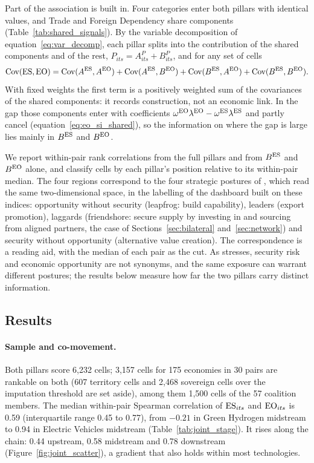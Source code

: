 Part of the association is built in. Four categories enter both pillars with identical values, and
Trade and Foreign Dependency share components (Table~\ref{tab:shared_signals}). By the variable
decomposition of equation~\eqref{eq:var_decomp}, each pillar splits into the contribution of the
shared components and of the rest, $P_{its}=A^{P}_{its}+B^{P}_{its}$, and for any set of cells
\begin{equation}\label{eq:joint_cov}
  \operatorname{Cov}(\mathrm{ES},\mathrm{EO})=\operatorname{Cov}(A^{\mathrm{ES}},A^{\mathrm{EO}})
  +\operatorname{Cov}(A^{\mathrm{ES}},B^{\mathrm{EO}})+\operatorname{Cov}(B^{\mathrm{ES}},A^{\mathrm{EO}})
  +\operatorname{Cov}(B^{\mathrm{ES}},B^{\mathrm{EO}}).
\end{equation}
With fixed weights the first term is a positively weighted sum of the covariances of the shared
components: it records construction, not an economic link. In the gap those components enter with
coefficients $\omega^{\mathrm{EO}}\lambda^{\mathrm{EO}}-\omega^{\mathrm{ES}}\lambda^{\mathrm{ES}}$ and partly cancel
(equation~\eqref{eq:eo_si_shared}), so the information on where the gap is large lies mainly in
$B^{\mathrm{ES}}$ and $B^{\mathrm{EO}}$.

We report within-pair rank correlations from the full pillars and from $B^{\mathrm{ES}}$ and $B^{\mathrm{EO}}$
alone, and classify cells by each pillar's position relative to its within-pair median. The four
regions correspond to the four strategic postures of \citet{carey2025secure}, which read the same
two-dimensional space, in the labelling of the dashboard built on these indices: opportunity without security
(leapfrog: build capability), leaders (export promotion), laggards (friendshore: secure supply
by investing in and sourcing from aligned partners, the case of Sections~\ref{sec:bilateral} and~\ref{sec:network}) and security
without opportunity (alternative value creation). The correspondence is a reading aid, with the
median of each pair as the cut. As \citet{neis2026allied} stresses, security risk and economic
opportunity are not synonyms, and the same exposure can warrant different postures; the results
below measure how far the two pillars carry distinct information.

\subsection{Results}\label{subsec:joint_results}

\paragraph{Sample and co-movement.} Both pillars score 6{,}232 cells; 3{,}157 cells for 175
economies in 30 pairs are rankable on both (607 territory cells and 2{,}468 sovereign cells over
the imputation threshold are set aside), among them 1{,}500 cells of the 57 coalition members. The
median within-pair Spearman correlation of $\mathrm{ES}_{its}$ and $\mathrm{EO}_{its}$ is 0.59 (interquartile range
0.45 to 0.77), from $-0.21$ in Green Hydrogen midstream to 0.94 in Electric Vehicles midstream
(Table~\ref{tab:joint_stage}). It rises along the chain: 0.44 upstream, 0.58 midstream and 0.78
downstream (Figure~\ref{fig:joint_scatter}), a gradient that also holds within most technologies.

